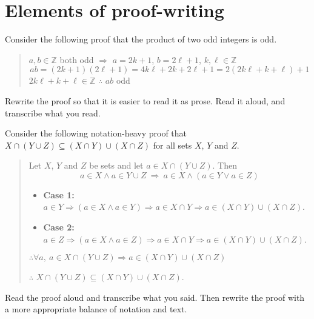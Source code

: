 \section{Elements of proof-writing}
\label{secElementsOfProofWriting}


\begin{exercise}
Consider the following proof that the product of two odd integers is odd.
\begin{quote}
$a,b \in \mathbb{Z}$ both odd $\Rightarrow$ $a=2k+1$, $b=2\ell+1$, $k,\ell \in \mathbb{Z}$
\[ ab = (2k+1)(2\ell+1) = 4k\ell+2k+2\ell+1 = 2(2k\ell+k+\ell)+1\]
$2k\ell + k + \ell \in \mathbb{Z}$ $\therefore$ $ab$ odd
\end{quote}
Rewrite the proof so that it is easier to read it as prose. Read it aloud, and transcribe what you read.
\end{exercise}



\begin{exercise}
Consider the following notation-heavy proof that $X \cap (Y \cup Z) \subseteq (X \cap Y) \cup (X \cap Z)$ for all sets $X$, $Y$ and $Z$.
\begin{quote}
Let $X$, $Y$ and $Z$ be sets and let $a \in X \cap (Y \cup Z)$. Then
\[ a \in X \wedge a \in Y \cup Z ~ \Rightarrow ~ a \in X \wedge (a \in Y \vee a \in Z) \]
\begin{itemize}
\item \textbf{Case 1:} $a \in Y \Rightarrow (a \in X \wedge a \in Y) \Rightarrow a \in X \cap Y \Rightarrow a \in (X \cap Y) \cup (X \cap Z)$.
\item \textbf{Case 2:} $a \in Z \Rightarrow (a \in X \wedge a \in Z) \Rightarrow a \in X \cap Y \Rightarrow a \in (X \cap Y) \cup (X \cap Z)$.
\end{itemize}
$\therefore \forall a,~ a \in X \cap (Y \cup Z) \Rightarrow a \in (X \cap Y) \cup (X \cap Z)$

$\therefore$ $X \cap (Y \cup Z) \subseteq (X \cap Y) \cup (X \cap Z)$.
\end{quote}
Read the proof aloud and transcribe what you said. Then rewrite the proof with a more appropriate balance of notation and text.
\end{exercise}

